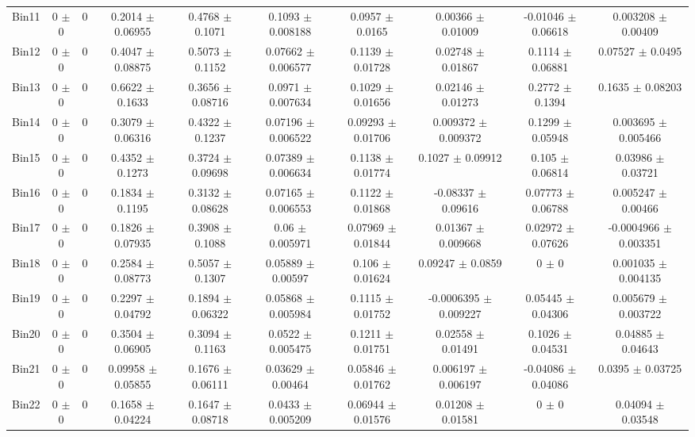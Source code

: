 \begin{tabular}{@{\extracolsep{4pt}}lccccccccc@{}}
     Bin11 & 0 $\pm$ 0 & 0 & 0.2014 $\pm$ 0.06955 & 0.4768 $\pm$ 0.1071 & 0.1093 $\pm$ 0.008188 & 0.0957 $\pm$ 0.0165 & 0.00366 $\pm$ 0.01009 & -0.01046 $\pm$ 0.06618 & 0.003208 $\pm$ 0.00409 \\ 
     Bin12 & 0 $\pm$ 0 & 0 & 0.4047 $\pm$ 0.08875 & 0.5073 $\pm$ 0.1152 & 0.07662 $\pm$ 0.006577 & 0.1139 $\pm$ 0.01728 & 0.02748 $\pm$ 0.01867 & 0.1114 $\pm$ 0.06881 & 0.07527 $\pm$ 0.0495 \\ 
     Bin13 & 0 $\pm$ 0 & 0 & 0.6622 $\pm$ 0.1633 & 0.3656 $\pm$ 0.08716 & 0.0971 $\pm$ 0.007634 & 0.1029 $\pm$ 0.01656 & 0.02146 $\pm$ 0.01273 & 0.2772 $\pm$ 0.1394 & 0.1635 $\pm$ 0.08203 \\ 
     Bin14 & 0 $\pm$ 0 & 0 & 0.3079 $\pm$ 0.06316 & 0.4322 $\pm$ 0.1237 & 0.07196 $\pm$ 0.006522 & 0.09293 $\pm$ 0.01706 & 0.009372 $\pm$ 0.009372 & 0.1299 $\pm$ 0.05948 & 0.003695 $\pm$ 0.005466 \\ 
     Bin15 & 0 $\pm$ 0 & 0 & 0.4352 $\pm$ 0.1273 & 0.3724 $\pm$ 0.09698 & 0.07389 $\pm$ 0.006634 & 0.1138 $\pm$ 0.01774 & 0.1027 $\pm$ 0.09912 & 0.105 $\pm$ 0.06814 & 0.03986 $\pm$ 0.03721 \\ 
     Bin16 & 0 $\pm$ 0 & 0 & 0.1834 $\pm$ 0.1195 & 0.3132 $\pm$ 0.08628 & 0.07165 $\pm$ 0.006553 & 0.1122 $\pm$ 0.01868 & -0.08337 $\pm$ 0.09616 & 0.07773 $\pm$ 0.06788 & 0.005247 $\pm$ 0.00466 \\ 
     Bin17 & 0 $\pm$ 0 & 0 & 0.1826 $\pm$ 0.07935 & 0.3908 $\pm$ 0.1088 & 0.06 $\pm$ 0.005971 & 0.07969 $\pm$ 0.01844 & 0.01367 $\pm$ 0.009668 & 0.02972 $\pm$ 0.07626 & -0.0004966 $\pm$ 0.003351 \\ 
     Bin18 & 0 $\pm$ 0 & 0 & 0.2584 $\pm$ 0.08773 & 0.5057 $\pm$ 0.1307 & 0.05889 $\pm$ 0.00597 & 0.106 $\pm$ 0.01624 & 0.09247 $\pm$ 0.0859 & 0 $\pm$ 0 & 0.001035 $\pm$ 0.004135 \\ 
     Bin19 & 0 $\pm$ 0 & 0 & 0.2297 $\pm$ 0.04792 & 0.1894 $\pm$ 0.06322 & 0.05868 $\pm$ 0.005984 & 0.1115 $\pm$ 0.01752 & -0.0006395 $\pm$ 0.009227 & 0.05445 $\pm$ 0.04306 & 0.005679 $\pm$ 0.003722 \\ 
     Bin20 & 0 $\pm$ 0 & 0 & 0.3504 $\pm$ 0.06905 & 0.3094 $\pm$ 0.1163 & 0.0522 $\pm$ 0.005475 & 0.1211 $\pm$ 0.01751 & 0.02558 $\pm$ 0.01491 & 0.1026 $\pm$ 0.04531 & 0.04885 $\pm$ 0.04643 \\ 
     Bin21 & 0 $\pm$ 0 & 0 & 0.09958 $\pm$ 0.05855 & 0.1676 $\pm$ 0.06111 & 0.03629 $\pm$ 0.00464 & 0.05846 $\pm$ 0.01762 & 0.006197 $\pm$ 0.006197 & -0.04086 $\pm$ 0.04086 & 0.0395 $\pm$ 0.03725 \\ 
     Bin22 & 0 $\pm$ 0 & 0 & 0.1658 $\pm$ 0.04224 & 0.1647 $\pm$ 0.08718 & 0.0433 $\pm$ 0.005209 & 0.06944 $\pm$ 0.01576 & 0.01208 $\pm$ 0.01581 & 0 $\pm$ 0 & 0.04094 $\pm$ 0.03548 \\ 

\end{tabular}
